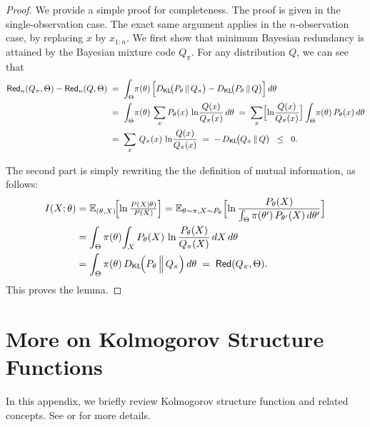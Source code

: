 \documentclass[11pt]{article}
\theoremstyle{plain}
\theoremstyle{definition}
\newcommand{\DKL}{D_{\mathsf{KL}}}
\newcommand{\redundency}{\mathsf{Red}}
\begin{document}
\begin{proof}
We provide a simple proof for completeness.
The proof is given in the single‐observation case.  
The exact same argument applies in the \(n\)-observation case, by replacing \(x\) by \(x_{1:n}\).
We first show that minimum Bayesian redundancy is attained by the Bayesian mixture code $Q_{\pi}$.
For any distribution $Q$, we can see that  
\begin{align*}
\redundency_n(Q_{\pi}, \Theta) - \redundency_n(Q, \Theta) &\;=\;
    \int_{\Theta}\!\pi(\theta)\,
      \Bigl[\DKL\!\bigl(P_{\theta}\,\|\,Q_{\pi}\bigr)
            -
            \DKL\!\bigl(P_{\theta}\,\|\,Q\bigr)\Bigr]
   \,d\theta \\
   & \;=\;
   \int_{\Theta}\!\pi(\theta)\,
   \sum_{x} P_{\theta}(x)\,\ln\!\frac{Q(x)}{Q_{\pi}(x)}
   \,d\theta 
   \;=\; 
  \sum_{x} \Bigl[\ln\!\frac{Q(x)}{Q_{\pi}(x)}\Bigr]
            \int_{\Theta}\!\pi(\theta)\,P_{\theta}(x)\,d\theta \\
   & \;=\; 
   \sum_{x}\,Q_{\pi}(x)\,\ln\!\frac{Q(x)}{Q_{\pi}(x)} 
   \;=\; 
   -\,\DKL\!\bigl(Q_{\pi}\,\|\,Q\bigr)
   \;\;\le\;\; 0.
\end{align*}

The second part is simply rewriting the the definition of mutual information, as follows:
\[
\begin{aligned}
  I(X; \theta)
  &=  \mathbb{E}_{(\theta,X)}\!\Bigl[\ln \tfrac{P(X\mid \theta)}{P(X)}\Bigr]
  = \mathbb{E}_{\theta\sim \pi,X\sim P_{\theta}}\Bigl[
       \ln \frac{P_\theta(X)}{\int_{\Theta} \pi(\theta')\,P_{\theta'}(X)\,d\theta'}
     \Bigr] \\
  &= \int_{\Theta} \pi(\theta)\!\int_{X} 
        P_{\theta}(X)
        \,\ln \frac{P_\theta(X)}{Q_{\pi}(X)}
     \,dX\,d\theta \\
  &= \int_{\Theta} \pi(\theta)\,\DKL\!\Bigl(P_{\theta} \,\Big\|\, Q_{\pi}\Bigr)\,d\theta \;=\; \redundency(Q_{\pi},\Theta) .
\end{aligned}
\]
This proves the lemma.
\end{proof}




\section{More on Kolmogorov Structure Functions}
\label{app:kolstructurefunc}
In this appendix, we 
briefly review Kolmogorov structure function
and related concepts.
See \cite[Ch 5.5]{li2008introduction} or \citep{vereshchagin2004kolmogorov,rissanen2005kolmogorov}
for more details.
\end{document}
